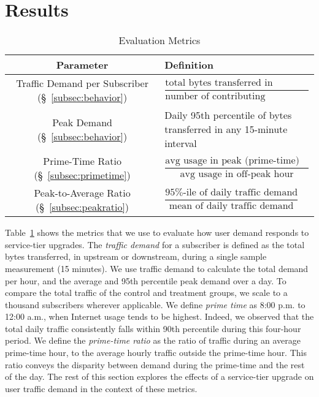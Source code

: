 \section{Results}\label{sec:analysis}

\begin{table}[t]
\centering
\begin{small}
\begin{tabular}{| c | p{2.44in} |}\hline
\textbf{Parameter} & \textbf{Definition}	\\\hline
Traffic Demand per Subscriber (\S~\ref{subsec:behavior})	& \(\dfrac{\text{total bytes transferred in 
measurement int.}}{\text{number of contributing subscribers}}\)	\\
Peak Demand (\S~\ref{subsec:behavior})			& Daily 95th percentile of bytes transferred in any 
15-minute interval \\ 
Prime-Time Ratio (\S~\ref{subsec:primetime}) 	& \( \dfrac{ \text{avg usage in peak (prime-time) 
hour}}{ \text{avg usage in off-peak hour}}\) 		\\
Peak-to-Average Ratio (\S~\ref{subsec:peakratio}) 	& \(\dfrac{\text{95\%-ile of daily traffic 
demand}}{\text{mean of daily traffic demand}}\)	\\\hline
\end{tabular}
\end{small}
\caption{Evaluation Metrics}
\label{tab:eval-criteria}
\end{table}

Table~\ref{tab:eval-criteria} shows the metrics that we use to evaluate
how user demand responds to service-tier upgrades. The \emph{traffic
  demand} for a subscriber is defined as the total bytes transferred, in
upstream or downstream, during a single sample measurement (15 minutes).
We use traffic demand to calculate the total demand per hour, and the
average and 95th percentile peak demand over a day. To compare the total
traffic of the control and treatment groups, we scale to a thousand
subscribers wherever applicable. We
define \emph{prime time} as 8:00 p.m. to 12:00 a.m., when Internet usage
tends to be highest.  Indeed, we
observed that the total daily traffic consistently falls within 90th percentile
during this four-hour period. We define the \emph{prime-time ratio} as
the ratio of traffic during an average prime-time hour, to the average
hourly traffic outside the prime-time hour.  This ratio conveys the
disparity between demand during the prime-time and the rest of the day.
The rest of this section explores the effects of a service-tier upgrade
on user traffic demand in the context of these metrics.









%